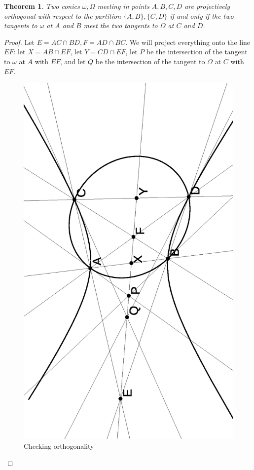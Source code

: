 \documentclass[letterpaper,11pt]{article}
\newtheorem{thm}{Theorem}
\theoremstyle{definition}
\theoremstyle{remark}
\begin{document}
\begin{thm} Two conics $\omega, \Omega$ meeting in points $A,B,C,D$ are projectively orthogonal with respect to the partition $\{A,B\},\{C,D\}$ if and only if the two tangents to $\omega$ at $A$ and $B$ meet the two tangents to $\Omega$ at $C$ and $D$.
\end{thm}
\begin{proof} Let $E = AC\cap BD, F = AD\cap BC$. We will project everything onto the line $EF$: let $X = AB\cap EF$, let $Y = CD\cap EF$, let $P$ be the intersection of the tangent to $\omega$ at $A$ with $EF$, and let $Q$ be the intersection of the tangent to $\Omega$ at $C$ with $EF$.

\begin{figure}[!htb]
\centering
\includegraphics[scale=0.5,angle=270]{north.eps}
\caption{Checking orthogonality}
\end{figure}


\end{proof}
\end{document}
